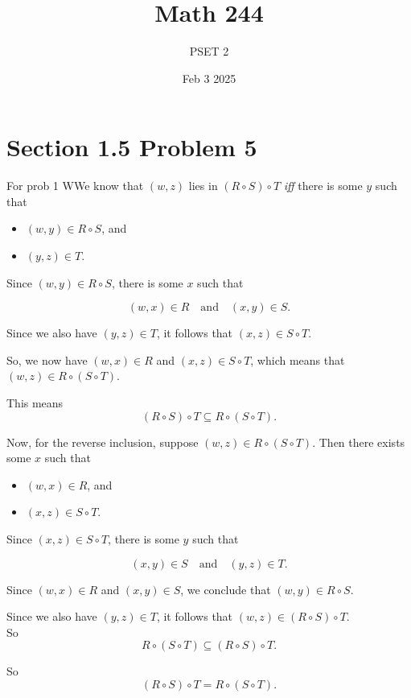 \documentclass{report}
\title{\Huge{Math 244}}
\author{\huge{PSET 2}}
\date{Feb 3 2025}
\begin{document}
\maketitle
\newpage%
\tableofcontents
\pagebreak

\section*{Section 1.5 Problem 5}



\begin{RemarkWithLily}{For prob 1}
  WWe know that $(w,z)$ lies in $(R \circ S) \circ T$ \textit{iff} there is some $y$ such that 
  \begin{itemize}
    \item [1] $(w,y) \in R \circ S$, and 
    \item [2] $(y,z) \in T$. 
  \end{itemize}

  Since $(w, y) \in R \circ S$, there is some $x$ such that 

  \[ (w,x) \in R \quad \text{and} \quad (x,y) \in S. \]

  Since we also have $(y,z) \in T$, it follows that $(x, z) \in S \circ T$. 

  So, we now have $(w,x) \in R$ and $(x,z) \in S \circ T$, which means that $(w,z) \in R \circ (S \circ T)$. 

  This means  
  \[ (R \circ S) \circ T \subseteq R \circ (S \circ T). \]

  Now, for the reverse inclusion, suppose $(w,z) \in R \circ (S \circ T)$. Then there exists some $x$ such that 
  \begin{itemize}
    \item [1] $(w,x) \in R$, and 
    \item [2] $(x,z) \in S \circ T$. 
  \end{itemize}

  Since $(x, z) \in S \circ T$, there is some $y$ such that 

  \[ (x,y) \in S \quad \text{and} \quad (y,z) \in T. \]

  Since $(w,x) \in R$ and $(x,y) \in S$, we conclude that $(w,y) \in R \circ S$. 

  Since we also have $(y,z) \in T$, it follows that $(w,z) \in (R \circ S) \circ T$. \\ 
   
  So 
  \[ R \circ (S \circ T) \subseteq (R \circ S) \circ T. \]

  So  
  \[ (R \circ S) \circ T = R \circ (S \circ T). \]

\end{RemarkWithLily}
\end{document}
